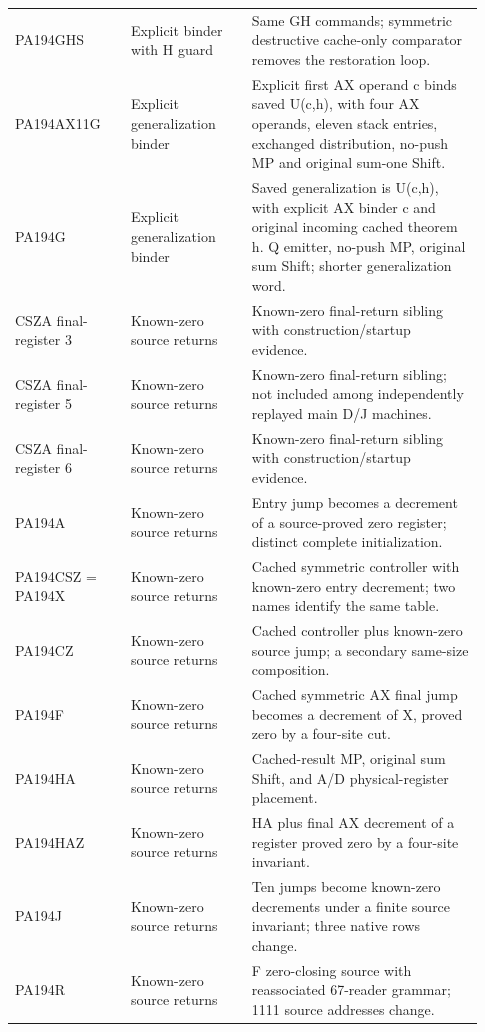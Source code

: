 \begin{longtable}{>{\raggedright\arraybackslash}p{0.23\linewidth}>{\raggedright\arraybackslash}p{0.24\linewidth}>{\raggedright\arraybackslash}p{0.46\linewidth}}
PA194GHS&Explicit binder with H guard&Same GH commands; symmetric destructive cache-only comparator removes the restoration loop.\\[5pt]
PA194AX11G&Explicit generalization binder&Explicit first AX operand c binds saved U(c,h), with four AX operands, eleven stack entries, exchanged distribution, no-push MP and original sum-one Shift.\\[5pt]
PA194G&Explicit generalization binder&Saved generalization is U(c,h), with explicit AX binder c and original incoming cached theorem h. Q emitter, no-push MP, original sum Shift; shorter generalization word.\\[5pt]
CSZA final-register 3&Known-zero source returns&Known-zero final-return sibling with construction/\allowbreak{}startup evidence.\\[5pt]
CSZA final-register 5&Known-zero source returns&Known-zero final-return sibling; not included among independently replayed main D/\allowbreak{}J machines.\\[5pt]
CSZA final-register 6&Known-zero source returns&Known-zero final-return sibling with construction/\allowbreak{}startup evidence.\\[5pt]
PA194A&Known-zero source returns&Entry jump becomes a decrement of a source-proved zero register; distinct complete initialization.\\[5pt]
PA194CSZ = PA194X&Known-zero source returns&Cached symmetric controller with known-zero entry decrement; two names identify the same table.\\[5pt]
PA194CZ&Known-zero source returns&Cached controller plus known-zero source jump; a secondary same-size composition.\\[5pt]
PA194F&Known-zero source returns&Cached symmetric AX final jump becomes a decrement of X, proved zero by a four-site cut.\\[5pt]
PA194HA&Known-zero source returns&Cached-result MP, original sum Shift, and A/\allowbreak{}D physical-register placement.\\[5pt]
PA194HAZ&Known-zero source returns&HA plus final AX decrement of a register proved zero by a four-site invariant.\\[5pt]
PA194J&Known-zero source returns&Ten jumps become known-zero decrements under a finite source invariant; three native rows change.\\[5pt]
PA194R&Known-zero source returns&F zero-closing source with reassociated 67-reader grammar; 1111 source addresses change.\\[5pt]

\end{longtable}
